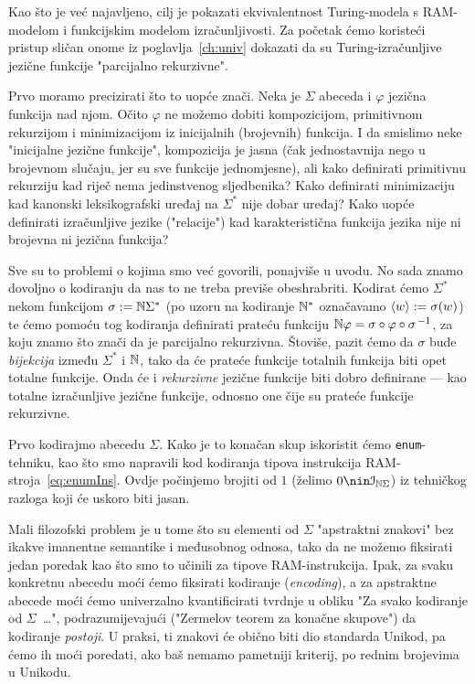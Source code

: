 Kao što je već najavljeno, cilj je pokazati ekvivalentnost Turing-modela s RAM-modelom i funkcijskim modelom izračunljivosti. Za početak ćemo koristeći pristup sličan onome iz poglavlja~\ref{ch:univ} dokazati da su Turing-izračunljive jezične funkcije "parcijalno rekurzivne".

Prvo moramo precizirati što to uopće znači. Neka je $\Sigma$ abeceda i $\varphi$ jezična funkcija nad njom. Očito $\varphi$ ne možemo dobiti kompozicijom, primitivnom rekurzijom i minimizacijom iz inicijalnih (brojevnih) funkcija. I da smislimo neke "inicijalne jezične funkcije", kompozicija je jasna (čak jednostavnija nego u brojevnom slučaju, jer su sve funkcije jednomjesne), ali kako definirati primitivnu rekurziju kad riječ nema jedinstvenog sljedbenika? Kako definirati minimizaciju kad kanonski leksikografski uređaj na $\Sigma^*$ nije dobar uređaj? Kako uopće definirati izračunljive jezike ("relacije") kad karakteristična funkcija jezika nije ni brojevna ni jezična funkcija?

Sve su to problemi o kojima smo već govorili, ponajviše u uvodu. No sada znamo dovoljno o kodiranju da nas to ne treba previše obeshrabriti. Kodirat ćemo $\Sigma^*$ nekom funkcijom $\sigma:={\mathbb N}\Sigma^*$ (po uzoru na kodiranje ${\mathbb N}^*$ označavamo $\langle w\rangle:=\sigma(w)$) te ćemo pomoću tog kodiranja definirati prateću funkciju ${\mathbb N}\varphi=\sigma\circ\varphi\circ\sigma^{\,-1}$, za koju znamo što znači da je parcijalno rekurzivna.
Štoviše, pazit ćemo da $\sigma$ bude \emph{bijekcija} između $\Sigma^*$ i ${\mathbb N}$, tako da će prateće funkcije totalnih funkcija biti opet totalne funkcije. Onda će i \emph{rekurzivne} jezične funkcije biti dobro definirane --- kao totalne izračunljive jezične funkcije, odnosno one čije su prateće funkcije rekurzivne.


Prvo kodirajmo abecedu $\Sigma$. Kako je to konačan skup iskoristit ćemo \texttt{enum}-tehniku, kao što smo napravili kod kodiranja tipova instrukcija RAM-stroja~\eqref{eq:enumIns}. Ovdje počinjemo brojiti od $1$ (želimo $0\nin\im{\N\Sigma}$) iz tehničkog razloga koji će uskoro biti jasan.

Mali filozofski problem je u tome što su elementi od $\Sigma$ "apstraktni znakovi" bez ikakve imanentne semantike i međusobnog odnosa, tako da ne možemo fiksirati jedan poredak kao što smo to učinili za tipove RAM-instrukcija. Ipak, za svaku konkretnu abecedu moći ćemo fiksirati kodiranje (\emph{encoding}), a za apstraktne abecede moći ćemo univerzalno kvantificirati tvrdnje u obliku "Za svako kodiranje od $\Sigma$~\ldots", podrazumijevajući ("Zermelov teorem za konačne skupove") da kodiranje \emph{postoji}. U praksi, ti znakovi će obično biti dio standarda Unikod, pa ćemo ih moći poredati, ako baš nemamo pametniji kriterij, po rednim brojevima u Unikodu.

